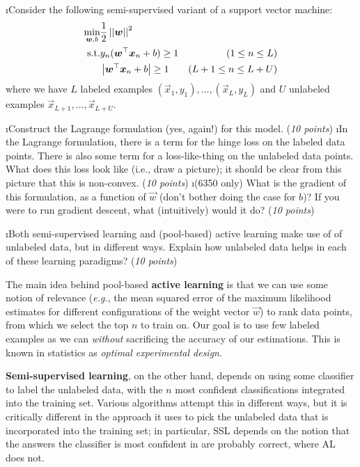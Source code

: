 \documentclass[fleqn]{article}
\begin{document}

\bee
\i Consider the following semi-supervised variant of a support vector
machine:
\begin{eqnarray}
\min_{\boldsymbol{w},b} & \frac 1 2 \left\vert\left\vert \boldsymbol{w} \right\vert\right\vert^2 & \\
\text{s.t.} & y_n (\boldsymbol{w}{}^\top\boldsymbol{x}_n + b) \geq 1 & (1\leq n\leq L)\\
& \left\vert \boldsymbol{w}{}^\top\boldsymbol{x}_n + b \right\vert \geq 1 & (L+1\leq n \leq L+U)
\end{eqnarray}
where we have $L$ labeled examples $(\vec x_1,y_1), \dots, (\vec x_L,
y_L)$ and $U$ unlabeled examples $\vec x_{L+1}, \dots, \vec x_{L+U}$.

\bee
\i Construct the Lagrange formulation (yes, again!) for this model.
(\emph{10 points})
\i In the Lagrange formulation, there is a term for the hinge loss on
the labeled data points.  There is also some term for a
loss-like-thing on the unlabeled data points.  What does this loss
look like (i.e., draw a picture); it should be clear from this picture
that this is non-convex.
(\emph{10 points}) 
\i (6350 only) What is the gradient of this formulation, as a function
of $\vec w$ (don't bother doing the case for $b$)?  If you were to run
gradient descent, what (intuitively) would it do? (\emph{10 points})
\ene

\i Both semi-supervised learning and (pool-based) active learning make
use of of unlabeled data, but in different ways. Explain how unlabeled 
data helps in each of these learning paradigms? (\emph{10 points})

\begin{solution}
The main idea behind pool-based \textbf{active learning} is that we can use some notion of relevance (\textit{e.g.}, the mean squared error of the maximum likelihood estimates for different configurations of the weight vector $\vec{w}$) to rank data points, from which we select the top $n$ to train on. Our goal is to use few labeled examples as we can \textit{without} sacrificing the accuracy of our estimations. This is known in statistics as \textit{optimal experimental design}. \linebreak

\textbf{Semi-supervised learning}, on the other hand, depends on using some classifier to label the unlabeled data, with the $n$ most confident classifications integrated into the training set. Various algorithms attempt this in different ways, but it is critically different in the approach it uses to pick the unlabeled data that is incorporated into the training set; in particular, SSL depends on the notion that the answers the classifier is most confident in are probably correct, where AL does not.
\end{solution}
\end{document}
